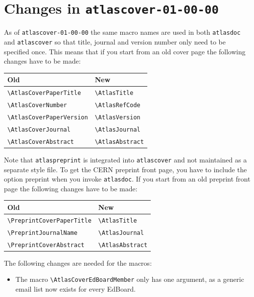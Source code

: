 \documentclass[UKenglish]{latex/atlasdoc}
\newcommand{\Macro}[1]{\texttt{\textbackslash #1}\xspace}
\newcommand{\Option}[1]{\textsf{#1}\xspace}
\newcommand{\Package}[1]{\texttt{#1}\xspace}
\begin{document}
\section{Changes in \texttt{atlascover-01-00-00}}
\label{sec:oldcover}

As of \Package{atlascover-01-00-00} the same macro names are used in both \Package{atlasdoc} and
\Package{atlascover} so that title, journal and version number only need to be specified once.
This means that if you start from an old cover page the following changes have to be made:
\begin{center}
  \begin{tabular}{ll}
    Old                            & New                   \\
    \midrule
    \Macro{AtlasCoverPaperTitle}   & \Macro{AtlasTitle}    \\
    \Macro{AtlasCoverNumber}       & \Macro{AtlasRefCode}  \\
    \Macro{AtlasCoverPaperVersion} & \Macro{AtlasVersion}  \\
    \Macro{AtlasCoverJournal}      & \Macro{AtlasJournal}  \\
    \Macro{AtlasCoverAbstract}     & \Macro{AtlasAbstract}
  \end{tabular}
\end{center}

Note that \Package{atlaspreprint} is integrated into \Package{atlascover} and not maintained as a separate style file.
To get the CERN preprint front page, you have to include the option \Option{preprint} when you invoke \Package{atlasdoc}.
If you start from an old preprint front page the following changes have to be made:
\begin{center}
  \begin{tabular}{ll}
    Old                              & New                   \\
    \midrule
    \Macro{PreprintCoverPaperTitle} & \Macro{AtlasTitle}    \\
    \Macro{PreprintJournalName}     & \Macro{AtlasJournal}  \\
    \Macro{PreprintCoverAbstract}   & \Macro{AtlasAbstract}
  \end{tabular}
\end{center}
The following changes are needed for the macros:
\begin{itemize}
\item The macro \Macro{AtlasCoverEdBoardMember} only has one argument, as a generic email list now exists for every EdBoard.
\end{itemize}
\end{document}
